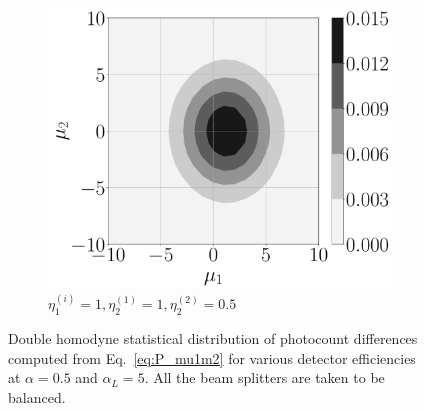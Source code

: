 \documentclass[%
reprint,
superscriptaddress,
 amsmath,amssymb,amsfonts,
 aps,
 pra,
 longbibliography
]{revtex4-2}
\begin{document}
\begin{figure}
    \begin{subfigure}[c]{.3\linewidth}
\includegraphics[width=\linewidth]{pics/double-homodyne/1110.5.pdf}
\caption[]{$\eta_1^{(i)}=1,\eta_2^{(1)}=1,\eta_2^{(2)}=0.5$}
        \end{subfigure}
        \caption{Double homodyne statistical distribution of photocount differences
          computed from Eq.~\eqref{eq:P_mu1m2}
          for various detector efficiencies at $\alpha=0.5$ and $\alpha_L=5$.
          All the beam splitters are taken to be balanced.
}
\label{fig:dh-statistics}
\end{figure}
\end{document}
